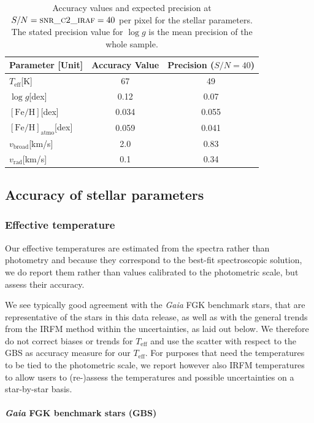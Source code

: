 \documentclass[fleqn,usenatbib,useAMS]{mnras}
\newcommand{\Teff}{$T_\mathrm{eff}$\xspace}
\newcommand{\logg}{$\log g$\xspace}
\newcommand{\feh}{$\mathrm{[Fe/H]}$\xspace}
\newcommand{\fehatmo}{$\mathrm{[Fe/H]}_\text{atmo}$\xspace}
\newcommand{\vbroad}{$v_\mathrm{broad}$\xspace}
\newcommand{\vrad}{$v_\mathrm{rad}$\xspace}
\newcommand{\Gaia}{\textit{Gaia}\xspace}
\begin{document}
\begin{table}
\centering
 \caption{Accuracy values and expected precision at $S/N = \textsc{snr\_c2\_iraf} = 40$ per pixel for the stellar parameters. The stated precision value for \logg is the mean precision of the whole sample.}
 \label{tab:accuracy_sp}
 \begin{tabular}{lcc}
  \hline \hline
Parameter [Unit] & Accuracy Value & Precision ($S/N=40$)\\
\hline
\Teff [K] & 67 & 49 \\
\logg [dex] & 0.12 & 0.07 \\
\feh [dex] & 0.034 & 0.055 \\
\fehatmo [dex] & 0.059 & 0.041\\
\vbroad [km/s] & 2.0 & 0.83 \\
\vrad [km/s] & 0.1 & 0.34 \\
\hline
\end{tabular}
\end{table}

\subsection{Accuracy of stellar parameters} \label{sec:accuracy_sp}

\subsubsection{Effective temperature}

Our effective temperatures are estimated from the spectra rather than photometry and because they correspond to the best-fit spectroscopic solution, we do report them rather than values calibrated to the photometric scale, but assess their accuracy.

We see typically good agreement with the \Gaia FGK benchmark stars, that are representative of the stars in this data release, as well as with the general trends from the IRFM method within the uncertainties, as laid out below. We therefore do not correct biases or trends for \Teff and use the scatter with respect to the GBS as accuracy measure for our \Teff. For purposes that need the temperatures to be tied to the photometric scale, we report however also IRFM temperatures to allow users to (re-)assess the temperatures and possible uncertainties on a star-by-star basis.

\paragraph*{\Gaia FGK benchmark stars (GBS)}
\end{document}

